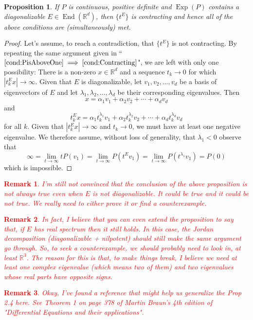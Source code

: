 \documentclass[11pt]{article}
\theoremstyle{theorem}
\newtheorem{proposition}[theorem]{Proposition}
\newtheorem{remark}{Remark}
\newcommand\End{\operatorname{End}} %
\newcommand\Exp{\operatorname{Exp}}
\begin{document}
\textcolor{red}{\hline}
\begin{proposition}
If $P$ is continuous, positive definite and $\Exp(P)$ contains a diagonalizable $E\in\End(\mathbb{R}^d)$, then $\{t^E\}$ is contracting and hence all of the above conditions are (simultaneously) met. 
\end{proposition}
\begin{proof}
Let's assume, to reach a contradiction, that $\{t^E\}$ is not contracting. By repeating the same argument given in ``$\ref{cond:PisAboveOne}\implies\ref{cond:Contracting}$", we are left with only one possibility: There is a non-zero $x\in\mathbb{R}^d$ and a sequence $t_k\to 0$ for which $|t_k^Ex|\to\infty$. Given that $E$ is diagonalizable, let $v_1,v_2,\dots,v_d$ be a basis of eigenvectors of $E$ and let $\lambda_1,\lambda_2,\dots,\lambda_d$ be their corresponding eigenvalues. Then
\begin{equation*}
x=\alpha_1v_1+\alpha_2v_2+\cdots+\alpha_dv_d
\end{equation*}
and
\begin{equation*}
t_k^Ex=\alpha_1t_k^{\lambda_1}v_1+\alpha_2t_k^{\lambda_2}v_2+\cdots+\alpha_dt_k^{\lambda_d}v_d
\end{equation*}
for all $k$. Given that $|t_k^Ex|\to\infty$ and $t_k\to 0$, we must have at least one negative eigenvalue. We therefore assume, without loss of generality, that $\lambda_1<0$ observe that
\begin{equation*}
\infty=\lim_{t\to \infty}tP(v_1)=\lim_{t\to\infty}P(t^E v_1)=\lim_{t\to \infty}P(t^{\lambda_1} v_1)=P(0)
\end{equation*}
which is impossible.
\end{proof}
\textcolor{red}{\begin{remark}I'm still not convinced that the conclusion of the above proposition is not always true even when $E$ is not diagonalizable. It could be true and it could be not true. We really need to either prove it or find a counterexample.
\end{remark}
\begin{remark}
In fact, I believe that you can even extend the proposition to say that, if $E$ has real spectrum then it still holds. In this case, the Jordan decomposition (diagonalizable + nilpotent) should still make the same argument go through. So, to seek a counterexample, we should probably need to look in, at least $\mathbb{R}^3$. The reason for this is that, to make things break, I believe we need at least one complex eigenvalue (which means two of them) and two eigenvalues whose real parts have opposite signs.
\end{remark}
\begin{remark}
Okay, I've found a reference that might help us generalize the Prop 2.4 here. See Theorem 1 on page 378 of Martin Braun's 4th edition of "Differential Equations and their applications". 
\end{remark}}
\end{document}
